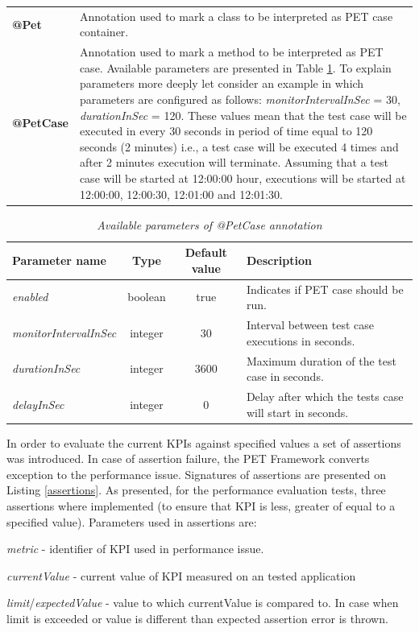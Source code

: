 \documentclass[12pt,a4paper]{article}
\let\tempone\itemize
\let\temptwo\enditemize
\renewenvironment{itemize}{\tempone\addtolength{\itemsep}{-0.4\baselineskip}}{\temptwo}
\begin{document}
\begin{table}[!htb]
\def\arraystretch{1.5}
\begin{tabularx}{\textwidth}{p{1.4cm}X}
\textbf{@Pet} 	  & Annotation used to mark a class to be interpreted as PET case container. \\ 
\textbf{@PetCase} & Annotation used to mark a method to be interpreted as PET case. Available parameters are presented in Table \ref{petcase}. To explain parameters more deeply let consider an example in which parameters are configured as follows: \textit{monitorIntervalInSec} = 30, \textit{durationInSec} = 120. These values mean that the test case will be executed in every 30 seconds in period of time equal to 120 seconds (2 minutes) i.e., a test case will be executed 4 times and after 2 minutes execution will terminate. Assuming that a test case will be started at 12:00:00 hour, executions will be started at 12:00:00, 12:00:30, 12:01:00 and 12:01:30. 
\end{tabularx}
\end{table}

\begin{table}[!htb]
\begin{center}
\begin{tabularx}{\textwidth}{l|c|c|X}
  \textbf{Parameter name} &\textbf{Type} & \textbf{Default value} & \textbf{Description} \\
\hline
			\textit{enabled} & boolean & true & Indicates if PET case should be run.\\
			\textit{monitorIntervalInSec} & integer & 30 & Interval between test case executions in seconds.\\
			\textit{durationInSec} & integer & 3600 & Maximum duration of the test case in seconds.\\
			\textit{delayInSec} & integer & 0 & Delay after which the tests case will start in seconds.\\
\end{tabularx}
\end{center}
\caption{\textit{Available parameters of @PetCase annotation}}\label{petcase}
\end{table}			

In order to evaluate the current KPIs against specified values a set of assertions was introduced. In case of assertion failure, the PET Framework converts exception to the performance issue. Signatures of assertions are presented on Listing  \ref{assertions}. As presented, for the performance evaluation tests, three assertions where implemented (to ensure that KPI is less, greater of equal to a specified value).  Parameters used in assertions are: 
\begin{itemize} 
\item \textit{metric} - identifier of KPI used in performance issue.
\item \textit{currentValue} - current value of KPI measured on an tested application
\item \textit{limit}/\textit{expectedValue} - value to which currentValue is compared to. In case when limit is exceeded or value is different than expected assertion error is thrown.
\end{itemize}
\end{document}
